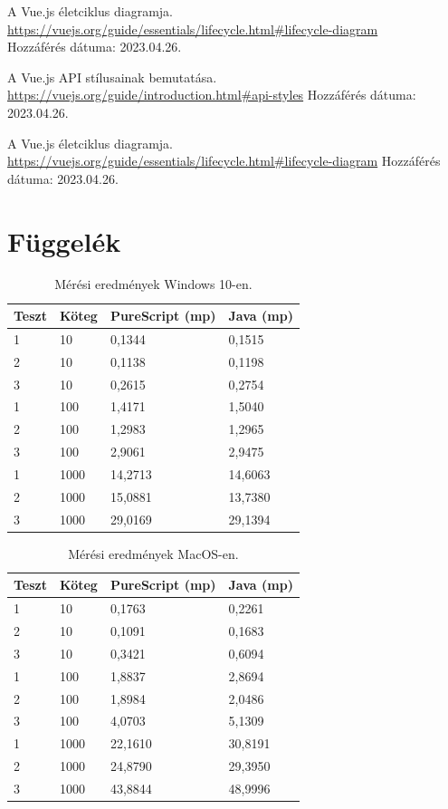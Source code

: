 \documentclass[12pt]{article}
\begin{document}
\begin{thebibliography}{99}
A Vue.js életciklus diagramja. \\ \url{https://vuejs.org/guide/essentials/lifecycle.html#lifecycle-diagram} \\Hozzáférés dátuma: 2023.04.26.

A Vue.js API stílusainak bemutatása. \url{https://vuejs.org/guide/introduction.html#api-styles} Hozzáférés dátuma: 2023.04.26.

A Vue.js életciklus diagramja. \url{https://vuejs.org/guide/essentials/lifecycle.html#lifecycle-diagram} Hozzáférés dátuma: 2023.04.26.

\end{thebibliography}

\newpage
\section*{Függelék}

\begin{table}[h!]
\centering
\begin{tabular}{ |p{3cm}|p{3cm}|p{3cm}|p{3cm}| } 
\hline
\textbf{Teszt} & \textbf{Köteg} &\textbf{PureScript (mp)} &\textbf{Java (mp)}\\
\hline 1& 10& 0,1344&0,1515\\
\hline 2& 10& 0,1138&0,1198\\
\hline 3& 10&0,2615 &0,2754\\
\hline 1& 100& 1,4171&1,5040\\
\hline 2& 100& 1,2983&1,2965\\
\hline 3& 100& 2,9061&2,9475\\
\hline 1& 1000& 14,2713&14,6063\\
\hline 2& 1000&15,0881 &13,7380\\
\hline 3& 1000&29,0169 &29,1394\\
\hline
\end{tabular}
\caption{Mérési eredmények Windows 10-en.}
\end{table}

\begin{table}[h!]
\centering
\begin{tabular}{ |p{3cm}|p{3cm}|p{3cm}|p{3cm}| } 
\hline
\textbf{Teszt} & \textbf{Köteg} &\textbf{PureScript (mp)} &\textbf{Java (mp)}\\
\hline 1& 10&0,1763 &0,2261\\
\hline 2& 10& 0,1091&0,1683\\
\hline 3& 10& 0,3421&0,6094\\
\hline 1& 100& 1,8837&2,8694\\
\hline 2& 100& 1,8984&2,0486\\
\hline 3& 100& 4,0703&5,1309\\
\hline 1& 1000& 22,1610&30,8191\\
\hline 2& 1000& 24,8790&29,3950\\
\hline 3& 1000& 43,8844&48,9996\\
\hline
\end{tabular}
\caption{Mérési eredmények MacOS-en.}
\end{table}
\end{document}
